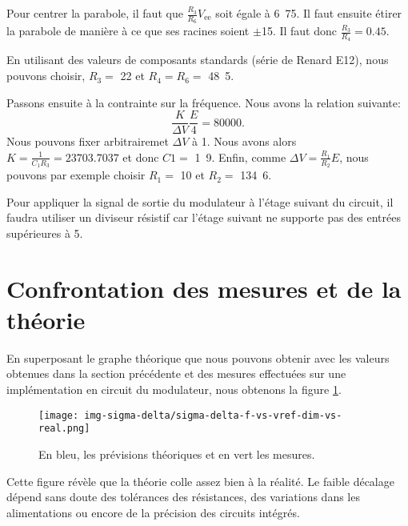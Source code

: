 Pour centrer la parabole, il faut que $\frac{R_3}{R_6}V_{\text{ee}}$
soit égale à \unit{6.75}{\volt}. Il faut ensuite étirer la
parabole de manière à ce que ses racines soient $\pm$\unit{15}{\volt}.
Il faut donc $\frac{R_3}{R_4} = 0.45$. 

En utilisant des valeurs de composants standards (série de Renard E12), 
nous pouvons choisir, $R_3 =$ \unit{22}{\kilo\ohm} et $R_4 = R_6 =
$ \unit{48.5}{\kilo\ohm}.

Passons ensuite à la contrainte sur la fréquence. Nous avons la 
relation suivante:
\[ \frac{K}{\Delta V}\frac{E}{4} = 80000.\]
Nous pouvons fixer arbitrairemet $\Delta V$ à \unit{1}{\volt}. Nous avons alors
$K = \frac{1}{C_1R_3} = 23703.7037$ et donc $C1 =$ \unit{1.9}{\nano\farad}.
Enfin, comme $\Delta V = \frac{R_1}{R_2}E$, nous pouvons par exemple
choisir $R_1 =$ \unit{10}{\kilo\ohm} et $R_2 =$ \unit{134.6}{\kilo\ohm}.

Pour appliquer la signal de sortie du modulateur
à l'étage suivant du circuit, il faudra utiliser un diviseur
résistif car l'étage suivant ne supporte pas des entrées supérieures
à \unit{5}{\volt}.

\section{Confrontation des mesures et de la théorie}
En superposant le graphe théorique que nous pouvons obtenir avec les valeurs
obtenues dans la section précédente
et des mesures effectuées sur une implémentation en circuit
du modulateur, nous obtenons la figure \ref{fig:sigma-delta-f-vs-vref-dim-vs-real}.

\begin{figure}[ht]
	\centering
	\texttt{[image: img-sigma-delta/sigma-delta-f-vs-vref-dim-vs-real.png]}
	\caption{En bleu, les prévisions théoriques et en vert les mesures.}
	\label{fig:sigma-delta-f-vs-vref-dim-vs-real}
\end{figure}

Cette figure révèle que la théorie colle assez bien à la réalité. Le
faible décalage dépend sans doute des tolérances des résistances,
des variations dans les alimentations ou encore de la précision des
circuits intégrés.